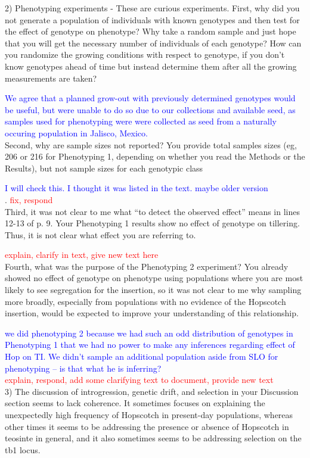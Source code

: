 \documentclass[11pt]{article}
\newcommand{\res}[1]{\noindent \textcolor{blue}{{#1}} \\}
\newcommand{\jri}[1]{\noindent \textcolor{red}{{#1}} \\}
\begin{document}
2) Phenotyping experiments - These are curious experiments.  First, why did you not generate a population of individuals with known genotypes and then test for the effect of genotype on phenotype?  Why take a random sample and just hope that you will get the necessary number of individuals of each genotype?  How can you randomize the growing conditions with respect to genotype, if you don’t know genotypes ahead of time but instead determine them after all the growing measurements are taken? 

\res{We agree that a planned grow-out with previously determined genotypes would be useful, but were unable to do so due to our collections and available seed, as samples used for phenotyping were were collected as seed from a naturally occuring population in Jalisco, Mexico.}

Second, why are sample sizes not reported?  You provide total samples sizes (eg, 206 or 216 for Phenotyping 1, depending on whether you read the Methods or the Results), but not sample sizes for each genotypic class 

\res{I will check this. I thought it was listed in the text. maybe older version}.  
\jri{fix, respond}

Third, it was not clear to me what “to detect the observed effect” means in lines 12-13 of p. 9.  Your Phenotyping 1 results show no effect of genotype on tillering.  Thus, it is not clear what effect you are referring to.  

\jri{explain, clarify in text, give new text here}

Fourth, what was the purpose of the Phenotyping 2  experiment?  You already showed no effect of genotype on phenotype using populations where you are most likely to see segregation for the insertion, so it was not clear to me why sampling more broadly, especially from populations with no evidence of the Hopscotch insertion, would be expected to improve your understanding of this relationship.

\res{we did phenotyping 2 because we had such an odd distribution of genotypes in Phenotyping 1 that we had no power to make any inferences regarding effect of Hop on TI. We didn't sample an additional population aside from SLO for phenotyping -- is that what he is inferring?} 
\jri{explain, respond, add some clarifying text to document, provide new text}

3) The discussion of introgression, genetic drift, and selection in your Discussion section seems to lack coherence.  It sometimes focuses on explaining the unexpectedly high frequency of Hopscotch in present-day populations, whereas other times it seems to be addressing the presence or absence of Hopscotch in teosinte in general, and it also sometimes seems to be addressing selection on the tb1 locus. 
\end{document}
